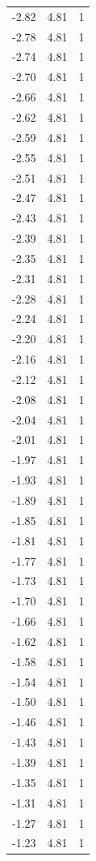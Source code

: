 \begin{longtable}{lrr}
  -2.82 & 4.81 & 1 \\
  -2.78 & 4.81 & 1 \\
  -2.74 & 4.81 & 1 \\
  -2.70 & 4.81 & 1 \\
  -2.66 & 4.81 & 1 \\
  -2.62 & 4.81 & 1 \\
  -2.59 & 4.81 & 1 \\
  -2.55 & 4.81 & 1 \\
  -2.51 & 4.81 & 1 \\
  -2.47 & 4.81 & 1 \\
  -2.43 & 4.81 & 1 \\
  -2.39 & 4.81 & 1 \\
  -2.35 & 4.81 & 1 \\
  -2.31 & 4.81 & 1 \\
  -2.28 & 4.81 & 1 \\
  -2.24 & 4.81 & 1 \\
  -2.20 & 4.81 & 1 \\
  -2.16 & 4.81 & 1 \\
  -2.12 & 4.81 & 1 \\
  -2.08 & 4.81 & 1 \\
  -2.04 & 4.81 & 1 \\
  -2.01 & 4.81 & 1 \\
  -1.97 & 4.81 & 1 \\
  -1.93 & 4.81 & 1 \\
  -1.89 & 4.81 & 1 \\
  -1.85 & 4.81 & 1 \\
  -1.81 & 4.81 & 1 \\
  -1.77 & 4.81 & 1 \\
  -1.73 & 4.81 & 1 \\
  -1.70 & 4.81 & 1 \\
  -1.66 & 4.81 & 1 \\
  -1.62 & 4.81 & 1 \\
  -1.58 & 4.81 & 1 \\
  -1.54 & 4.81 & 1 \\
  -1.50 & 4.81 & 1 \\
  -1.46 & 4.81 & 1 \\
  -1.43 & 4.81 & 1 \\
  -1.39 & 4.81 & 1 \\
  -1.35 & 4.81 & 1 \\
  -1.31 & 4.81 & 1 \\
  -1.27 & 4.81 & 1 \\
  -1.23 & 4.81 & 1 \\

\end{longtable}
